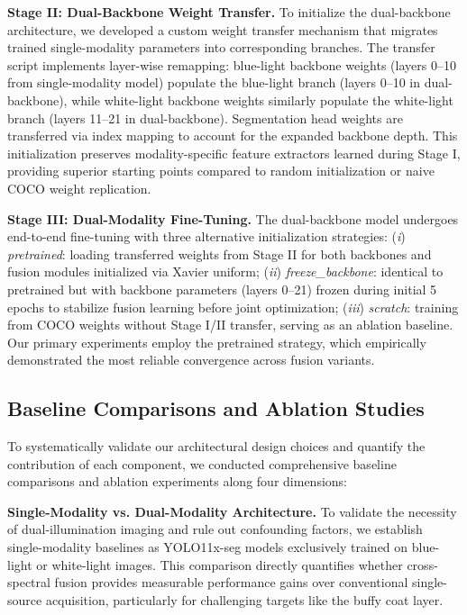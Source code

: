 \textbf{Stage II: Dual-Backbone Weight Transfer.} To initialize the dual-backbone architecture, we developed a custom weight transfer mechanism that migrates trained single-modality parameters into corresponding branches. The transfer script implements layer-wise remapping: blue-light backbone weights (layers 0--10 from single-modality model) populate the blue-light branch (layers 0--10 in dual-backbone), while white-light backbone weights similarly populate the white-light branch (layers 11--21 in dual-backbone). Segmentation head weights are transferred via index mapping to account for the expanded backbone depth. This initialization preserves modality-specific feature extractors learned during Stage I, providing superior starting points compared to random initialization or naive COCO weight replication.

\textbf{Stage III: Dual-Modality Fine-Tuning.} The dual-backbone model undergoes end-to-end fine-tuning with three alternative initialization strategies: (\textit{i}) \textit{pretrained}: loading transferred weights from Stage II for both backbones and fusion modules initialized via Xavier uniform; (\textit{ii}) \textit{freeze\_backbone}: identical to pretrained but with backbone parameters (layers 0--21) frozen during initial 5 epochs to stabilize fusion learning before joint optimization; (\textit{iii}) \textit{scratch}: training from COCO weights without Stage I/II transfer, serving as an ablation baseline. Our primary experiments employ the pretrained strategy, which empirically demonstrated the most reliable convergence across fusion variants.

\subsection{Baseline Comparisons and Ablation Studies}

To systematically validate our architectural design choices and quantify the contribution of each component, we conducted comprehensive baseline comparisons and ablation experiments along four dimensions:

\textbf{Single-Modality vs. Dual-Modality Architecture.} To validate the necessity of dual-illumination imaging and rule out confounding factors, we establish single-modality baselines as YOLO11x-seg models exclusively trained on blue-light or white-light images. 
This comparison directly quantifies whether cross-spectral fusion provides measurable performance gains over conventional single-source acquisition, particularly for challenging targets like the buffy coat layer.

